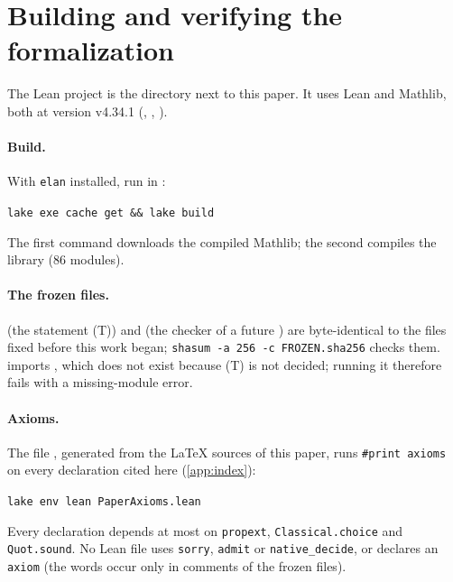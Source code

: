 \section{Building and verifying the formalization}\label{app:verify}

The Lean project is the directory  next to this paper. It uses Lean and Mathlib, both at version
v4.34.1 (, , ).

\paragraph{Build.} With \texttt{elan} installed, run in :
\begin{center}
\texttt{lake exe cache get \&\& lake build}
\end{center}
The first command downloads the compiled Mathlib; the second compiles the library (86 modules).

\paragraph{The frozen files.}  (the statement (T)) and  (the
checker of a future ) are byte-identical to the files fixed before this work began;
\texttt{shasum -a 256 -c FROZEN.sha256} checks them.  imports
, which does not exist because (T) is not decided; running it therefore fails with a
missing-module error.

\paragraph{Axioms.} The file , generated from the \LaTeX{} sources of this paper, runs
\texttt{\#print axioms} on every declaration cited here (\cref{app:index}):
\begin{center}
\texttt{lake env lean PaperAxioms.lean}
\end{center}
Every declaration depends at most on \texttt{propext}, \texttt{Classical.choice} and \texttt{Quot.sound}. No Lean file uses
\texttt{sorry}, \texttt{admit} or \texttt{native\_decide}, or declares an \texttt{axiom} (the words occur only in
comments of the frozen files).

